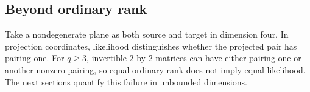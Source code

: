 \subsection{Beyond ordinary rank}

Take a nondegenerate plane as both source and target in dimension
four. In projection coordinates, likelihood distinguishes whether
the projected pair has pairing one. For $q\ge3$, invertible
$2$ by $2$ matrices can have either pairing one or another nonzero
pairing, so equal ordinary rank does not imply equal likelihood.
The next sections quantify this failure in unbounded dimensions.
